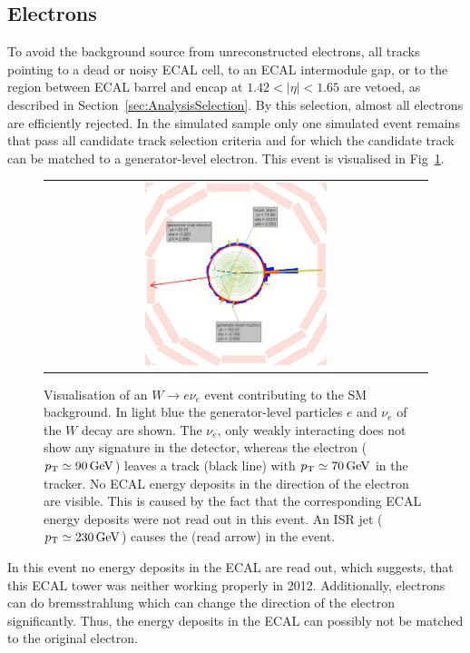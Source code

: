 \subsection*{Electrons}
To avoid the background source from unreconstructed electrons, all tracks pointing to a dead or noisy ECAL cell, to an ECAL intermodule gap, or to the region between ECAL barrel and encap at $1.42<|\eta|<1.65$ are vetoed, 
as described in Section~\ref{sec:AnalysisSelection}.
By this selection, almost all electrons are efficiently rejected.
In the simulated \WJets sample only one simulated event remains that pass all candidate track selection criteria and for which the candidate track can be matched to a generator-level electron.
This event is visualised in Fig~\ref{fig:LostElectron}. 
\begin{figure}[!t]
  \centering 
  \begin{tabular}{c}
    \includegraphics[width=0.49\textwidth]{figures/analysis/Electron_lumi_279317_event_111637553.png}
  \end{tabular}
 \caption{Visualisation of an $W\rightarrow e\nu_e$ event contributing to the SM background. 
           In light blue the generator-level particles $e$ and $\nu_e$ of the $W$ decay are shown. 
           The $\nu_e$, only weakly interacting does not show any signature in the detector, whereas the electron ($p_{\text{T}}\simeq 90\,\text{Ge}\kern-0.06667em\text{V}$) leaves a track (black line) with \mbox{$p_{\text{T}}\simeq 70\,\text{Ge}\kern-0.06667em\text{V}$} in the tracker. 
           No ECAL energy deposits in the direction of the electron are visible. 
           This is caused by the fact that the corresponding ECAL energy deposits were not read out in this event.
           An ISR jet ($p_{\text{T}}\simeq 230\,\text{Ge}\kern-0.06667em\text{V}$) causes the \met (read arrow) in the event. }
  \label{fig:LostElectron}
\end{figure}
 
In this event no energy deposits in the ECAL are read out, which suggests, that this ECAL tower was neither working properly in 2012.
Additionally, electrons can do bremsstrahlung which can change the direction of the electron significantly.
Thus, the energy deposits in the ECAL can possibly not be matched to the original electron.

